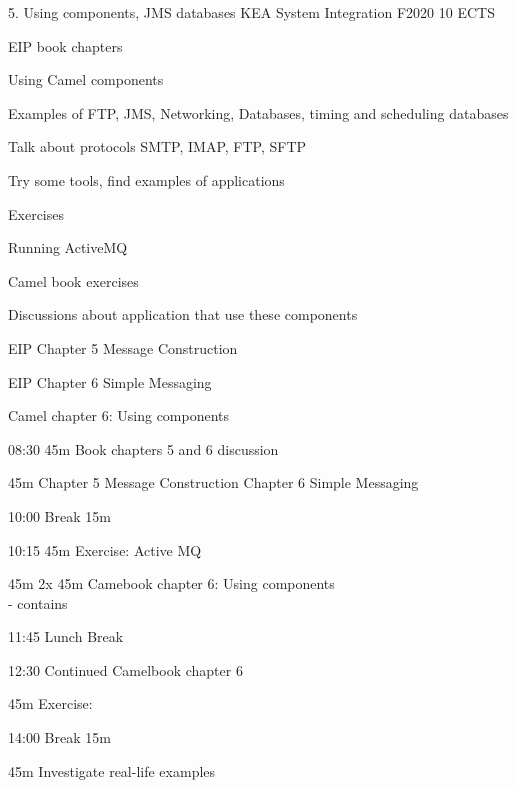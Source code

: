 \documentclass[Screen16to9,17pt]{foils}
\begin{document}
\mytitlepage
{5. Using components, JMS
 databases}
{KEA System Integration F2020 10 ECTS}


\begin{list2}
\item EIP book chapters
\item Using Camel components
\item Examples of FTP, JMS, Networking, Databases, timing and scheduling
 databases
\item Talk about protocols SMTP, IMAP, FTP, SFTP
\item Try some tools, find examples of applications
\end{list2}

Exercises
\begin{list2}
\item Running ActiveMQ
\item Camel book exercises
\item Discussions about application that use these components
\end{list2}




\begin{list1}
\item EIP Chapter 5 Message Construction
\item EIP Chapter 6 Simple Messaging
\item Camel chapter 6: Using components

\end{list1}




\begin{list2}
\item 08:30 45m Book chapters 5 and 6 discussion
\item 45m Chapter 5 Message Construction Chapter 6 Simple Messaging
\item 10:00 Break 15m
\item 10:15 45m Exercise: Active MQ
\item 45m 2x 45m Camebook chapter 6: Using components\\
 - contains
\item 11:45 Lunch Break
\item 12:30 Continued Camelbook chapter 6
\item 45m Exercise:
\item 14:00 Break 15m
\item 45m Investigate real-life examples
\end{list2}
\end{document}
